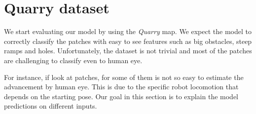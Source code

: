 
\section{Quarry dataset}
\label{sec: quarry-dataset}

We start evaluating our model by using the \emph{Quarry} map. We expect the model to correctly classify the patches with easy to see features such as big obstacles, steep ramps and holes. Unfortunately, the dataset is not trivial and most of the patches are challenging to classify even to human eye. 

For instance, if look at patches, for some of them is not so easy to estimate the advancement by human eye. This is due to the specific robot locomotion that depends on the starting pose. Our goal in this section is to explain the model predictions on different inputs. 

